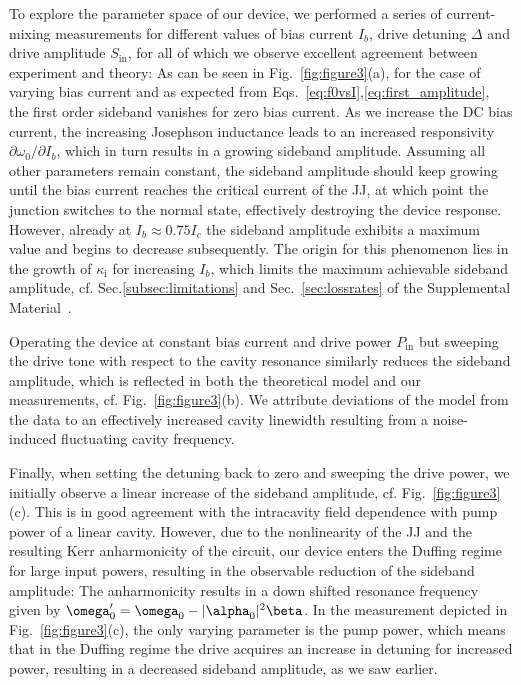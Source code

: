 % 
To explore the parameter space of our device, we performed a series of current-mixing measurements for different values of bias current $I_b$, drive detuning $\Delta$ and drive amplitude $S_\text{in}$, for all of which we observe excellent agreement between experiment and theory:
% 
As can be seen in Fig.~\ref{fig:figure3}(a), for the case of varying bias current and as expected from Eqs.~\eqref{eq:f0vsI},\eqref{eq:first_amplitude}, the first order sideband vanishes for zero bias current.
% 
As we increase the DC bias current, the increasing Josephson inductance leads to an increased responsivity $\partial\omega_0/\partial I_b$, which in turn results in a growing sideband amplitude.
% 
Assuming all other parameters remain constant, the sideband amplitude should keep growing until the bias current reaches the critical current of the JJ, at which point the junction switches to the normal state, effectively destroying the device response.
% 
However, already at $I_b \approx 0.75 I_c$ the sideband amplitude exhibits a maximum value and begins to decrease subsequently.
% 
The origin for this phenomenon lies in the growth of $\kappa_\text{i}$ for increasing $I_b$, which limits the maximum achievable sideband amplitude, cf. Sec.\ref{subsec:limitations} and Sec.~\ref{sec:lossrates} of the Supplemental Material~\cite{SeeSupplementalMaterial}.

Operating the device at constant bias current and drive power $P_\text{in}$ but sweeping the drive tone with respect to the cavity resonance similarly reduces the sideband amplitude, which is reflected in both the theoretical model and our measurements, cf. Fig.~\ref{fig:figure3}(b).
% 
We attribute deviations of the model from the data to an effectively increased cavity linewidth resulting from a noise-induced fluctuating cavity frequency.

Finally, when setting the detuning back to zero and sweeping the drive power, we initially observe a linear increase of the sideband amplitude, cf. Fig.~\ref{fig:figure3}(c).
% 
This is in good agreement with the intracavity field dependence with pump power of a linear cavity.
% 
However, due to the nonlinearity of the JJ and the resulting Kerr anharmonicity of the circuit, our device enters the Duffing regime for large input powers, resulting in the observable reduction of the sideband amplitude:
% 
The anharmonicity results in a down shifted resonance frequency given by $\omega_0^\prime = \omega_0-\abs{\alpha_0}^2\beta$.
% 
In the measurement depicted in Fig.~\ref{fig:figure3}(c), the only varying parameter is the pump power, which means that in the Duffing regime the drive acquires an increase in detuning for increased power, resulting in a decreased sideband amplitude, as we saw earlier.

